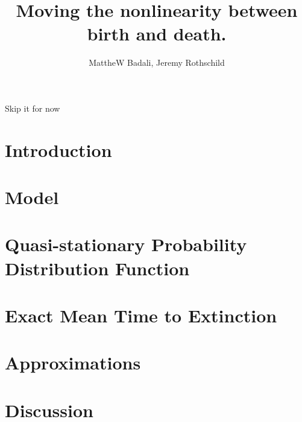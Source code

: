 \documentclass[a4paper,10pt]{article}
\title{Moving the nonlinearity between birth and death.}
\author{MattheW Badali, Jeremy Rothschild}
\numberwithin{equation}{section} %
\begin{document}
\maketitle

Skip it for now

\section{Introduction}



\section{Model}



\section{Quasi-stationary Probability Distribution Function}



\section{Exact Mean Time to Extinction}%



\section{Approximations}



\section{Discussion}





\end{document}
